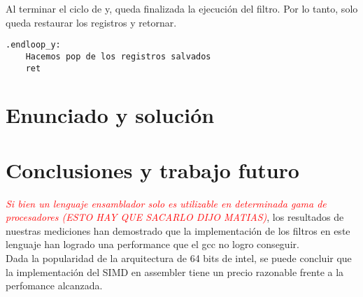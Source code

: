\documentclass[a4paper]{article}
\begin{document}
\indent Al terminar el ciclo de y, queda finalizada la ejecuci\'on del filtro. Por lo tanto, solo queda restaurar los registros y retornar.
\begin{codesnippet}
\begin{verbatim}
.endloop_y:
    Hacemos pop de los registros salvados
    ret
\end{verbatim}
\end{codesnippet}
\newpage
\section{Enunciado y soluci\'on} 

%

\section{Conclusiones y trabajo futuro}
\indent\emph{ \textcolor{red}{Si bien un lenguaje ensamblador solo es utilizable en determinada gama de procesadores (ESTO HAY QUE SACARLO DIJO MATIAS)}}, los resultados de nuestras mediciones han demostrado que la implementación de los filtros en este lenguaje han logrado una performance que el gcc no logro conseguir. \\
\indent Dada la popularidad de la arquitectura de 64 bits de intel, se puede concluir que la implementación del SIMD en assembler tiene un precio razonable frente a la perfomance alcanzada.\\
\end{document}
